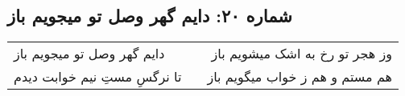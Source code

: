 \begin{center}
\section*{شماره ۲۰: دایم گهر وصل تو میجویم باز}
\label{sec:020}
\begin{longtable}{l p{0.5cm} r}
دایم گهر وصل تو میجویم باز
&&
وز هجر تو رخ به اشک میشویم باز
\\
تا نرگسِ مستِ نیم خوابت دیدم
&&
هم مستم و هم ز خواب میگویم باز
\\
\end{longtable}
\end{center}

